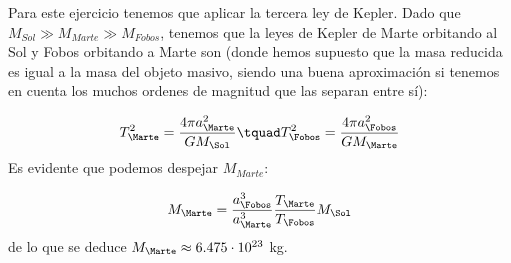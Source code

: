     Para este ejercicio tenemos que aplicar la tercera ley de Kepler. Dado que $M_{Sol}\gg M_{Marte} \gg M_{Fobos}$, tenemos que la leyes de Kepler de Marte orbitando al Sol y Fobos orbitando a Marte son (donde hemos supuesto que la masa reducida es igual a la masa del objeto masivo, siendo una buena aproximación si tenemos en cuenta los muchos ordenes de magnitud que las separan entre sí):

    \begin{equation}
        T_{\Marte}^2 = \frac{4\pi a_{\Marte}^2}{GM_{\Sol}}   \tquad
        T_{\Fobos}^2 = \frac{4\pi a_{\Fobos}^2}{GM_{\Marte}}
    \end{equation}
    Es evidente que podemos despejar $M_{Marte}$:

    \begin{equation}
        M_{\Marte} = \frac{a_\Fobos^3}{a_\Marte^3} \frac{T_\Marte}{T_\Fobos} M_\Sol
    \end{equation}
    de lo que se deduce $M_\Marte\approx 6.475 \cdot 10^{23}$ kg.
